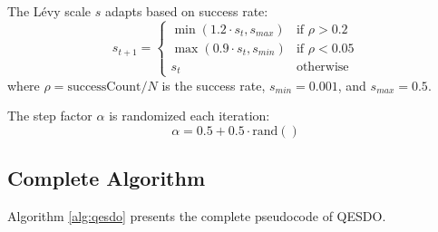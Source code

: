 \documentclass[preprint,12pt]{elsarticle}
\begin{document}
The Lévy scale $s$ adapts based on success rate:
\begin{equation}
s_{t+1} = \begin{cases}
\min(1.2 \cdot s_t, s_{max}) & \text{if } \rho > 0.2 \\
\max(0.9 \cdot s_t, s_{min}) & \text{if } \rho < 0.05 \\
s_t & \text{otherwise}
\end{cases}
\label{eq:levy_adapt}
\end{equation}
where $\rho = \text{successCount}/N$ is the success rate, $s_{min} = 0.001$, and $s_{max} = 0.5$.

The step factor $\alpha$ is randomized each iteration:
\begin{equation}
\alpha = 0.5 + 0.5 \cdot \text{rand}()
\label{eq:alpha_random}
\end{equation}

\subsection{Complete Algorithm}
\label{subsec:pseudocode}

Algorithm \ref{alg:qesdo} presents the complete pseudocode of QESDO.
\end{document}
